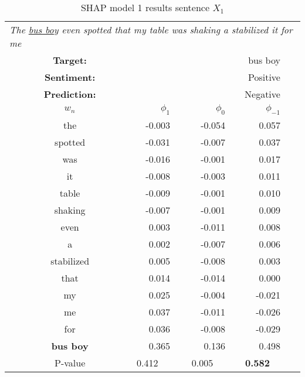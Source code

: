 \begin{table}[ht]
\caption{SHAP model 1 results sentence $X_1$}
\centering
\begin{tabular}{p{22mm} c r r r c}
\multicolumn{6}{l}{{\textit{The  \underline{bus boy} even spotted that my table was shaking a stabilized it for me}}}\\
\cmidrule(lr){2-5}%
&\textbf{Target:}    &   \multicolumn{3}{r}{bus boy}\\
&\textbf{Sentiment:} & \multicolumn{3}{r}{Positive}\\
&\textbf{Prediction:} & \multicolumn{3}{r}{Negative}\\
\cmidrule(lr){2-5}
&$w_n$           &   $\phi_1$    &   $\phi_0$    & $\phi_{-1}$\\
\cmidrule(lr){2-2}     \cmidrule(lr){3-5}%
&the                &   -0.003      &   -0.054      &   0.057\\
&spotted            &   -0.031      &   -0.007      &   0.037\\
&was                &   -0.016      &   -0.001      &   0.017\\
&it                 &   -0.008      &   -0.003      &   0.011\\
&table              &   -0.009      &   -0.001      &   0.010\\
&shaking            &   -0.007      &   -0.001      &   0.009\\
&even               &   0.003       &   -0.011      &   0.008\\
&a                  &   0.002       &   -0.007      &   0.006\\
&stabilized         &   0.005       &   -0.008      &   0.003\\
&that               &   0.014       &   -0.014      &   0.000\\
&my                 &   0.025       &   -0.004      &   -0.021\\
&me                 &   0.037       &   -0.011      &   -0.026\\
&for                &   0.036       &   -0.008      &   -0.029\\
&\textbf{bus boy}   &   0.365       &   0.136       &   0.498\\
\cmidrule(lr){2-5}
&P-value & \multicolumn{1}{c}{0.412} & \multicolumn{1}{c}{0.005} & \multicolumn{1}{c}{\textbf{0.582}}
\end{tabular}
\label{tab:shap1_sen1}
\end{table}

